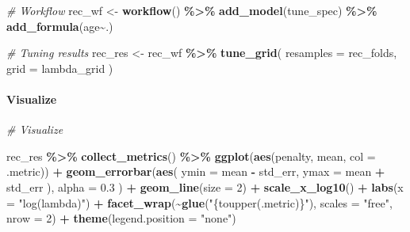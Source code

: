 \documentclass[
]{book}
\newenvironment{Shaded}{\begin{snugshade}}{\end{snugshade}}
\newcommand{\CommentTok}[1]{\textcolor[rgb]{0.56,0.35,0.01}{\textit{#1}}}
\newcommand{\DataTypeTok}[1]{\textcolor[rgb]{0.13,0.29,0.53}{#1}}
\newcommand{\DecValTok}[1]{\textcolor[rgb]{0.00,0.00,0.81}{#1}}
\newcommand{\FloatTok}[1]{\textcolor[rgb]{0.00,0.00,0.81}{#1}}
\newcommand{\KeywordTok}[1]{\textcolor[rgb]{0.13,0.29,0.53}{\textbf{#1}}}
\newcommand{\NormalTok}[1]{#1}
\newcommand{\OperatorTok}[1]{\textcolor[rgb]{0.81,0.36,0.00}{\textbf{#1}}}
\newcommand{\StringTok}[1]{\textcolor[rgb]{0.31,0.60,0.02}{#1}}
\begin{document}
\begin{Shaded}
\begin{Highlighting}[]
\CommentTok{\# Workflow }
\NormalTok{rec\_wf \textless{}{-}}\StringTok{ }\KeywordTok{workflow}\NormalTok{() }\OperatorTok{\%\textgreater{}\%}
\StringTok{  }\KeywordTok{add\_model}\NormalTok{(tune\_spec) }\OperatorTok{\%\textgreater{}\%}
\StringTok{  }\KeywordTok{add\_formula}\NormalTok{(age}\OperatorTok{\textasciitilde{}}\NormalTok{.)}
\end{Highlighting}
\end{Shaded}

\begin{Shaded}
\begin{Highlighting}[]
\CommentTok{\# Tuning results }
\NormalTok{rec\_res \textless{}{-}}\StringTok{ }\NormalTok{rec\_wf }\OperatorTok{\%\textgreater{}\%}
\StringTok{  }\KeywordTok{tune\_grid}\NormalTok{(}
    \DataTypeTok{resamples =}\NormalTok{ rec\_folds, }
    \DataTypeTok{grid =}\NormalTok{ lambda\_grid}
\NormalTok{  )}
\end{Highlighting}
\end{Shaded}

\hypertarget{visualize}{%
\paragraph{Visualize}\label{visualize}}

\begin{Shaded}
\begin{Highlighting}[]
\CommentTok{\# Visualize}

\NormalTok{rec\_res }\OperatorTok{\%\textgreater{}\%}
\StringTok{  }\KeywordTok{collect\_metrics}\NormalTok{() }\OperatorTok{\%\textgreater{}\%}
\StringTok{  }\KeywordTok{ggplot}\NormalTok{(}\KeywordTok{aes}\NormalTok{(penalty, mean, }\DataTypeTok{col =}\NormalTok{ .metric)) }\OperatorTok{+}
\StringTok{  }\KeywordTok{geom\_errorbar}\NormalTok{(}\KeywordTok{aes}\NormalTok{(}
    \DataTypeTok{ymin =}\NormalTok{ mean }\OperatorTok{{-}}\StringTok{ }\NormalTok{std\_err,}
    \DataTypeTok{ymax =}\NormalTok{ mean }\OperatorTok{+}\StringTok{ }\NormalTok{std\_err}
\NormalTok{  ),}
  \DataTypeTok{alpha =} \FloatTok{0.3}
\NormalTok{  ) }\OperatorTok{+}
\StringTok{  }\KeywordTok{geom\_line}\NormalTok{(}\DataTypeTok{size =} \DecValTok{2}\NormalTok{) }\OperatorTok{+}
\StringTok{  }\KeywordTok{scale\_x\_log10}\NormalTok{() }\OperatorTok{+}
\StringTok{  }\KeywordTok{labs}\NormalTok{(}\DataTypeTok{x =} \StringTok{"log(lambda)"}\NormalTok{) }\OperatorTok{+}
\StringTok{  }\KeywordTok{facet\_wrap}\NormalTok{(}\OperatorTok{\textasciitilde{}}\KeywordTok{glue}\NormalTok{(}\StringTok{"\{toupper(.metric)\}"}\NormalTok{), }
             \DataTypeTok{scales =} \StringTok{"free"}\NormalTok{,}
             \DataTypeTok{nrow =} \DecValTok{2}\NormalTok{) }\OperatorTok{+}
\StringTok{  }\KeywordTok{theme}\NormalTok{(}\DataTypeTok{legend.position =} \StringTok{"none"}\NormalTok{)}
\end{Highlighting}
\end{Shaded}
\end{document}
